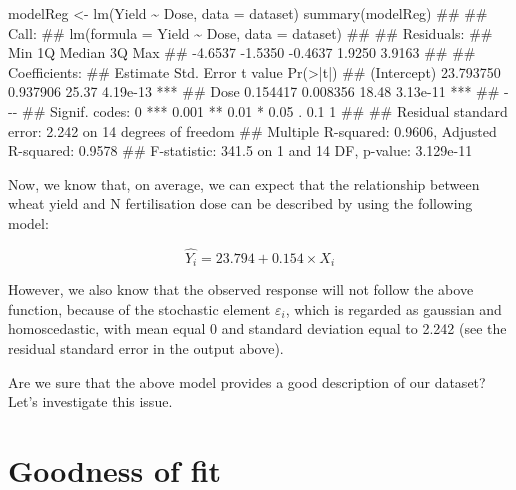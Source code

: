 \documentclass[a4paper,12pt,oneside]{book}
\newenvironment{Shaded}{\begin{snugshade}}{\end{snugshade}}
\newcommand{\SpecialCharTok}[1]{#1}
\newcommand{\DocumentationTok}[1]{#1}
\newcommand{\OtherTok}[1]{#1}
\newcommand{\FunctionTok}[1]{#1}
\newcommand{\AttributeTok}[1]{#1}
\newcommand{\NormalTok}[1]{#1}
\begin{document}
\begin{Shaded}
\begin{Highlighting}[]
\NormalTok{modelReg }\OtherTok{\textless{}{-}} \FunctionTok{lm}\NormalTok{(Yield }\SpecialCharTok{\textasciitilde{}}\NormalTok{ Dose, }\AttributeTok{data =}\NormalTok{ dataset)}
\FunctionTok{summary}\NormalTok{(modelReg)}
\DocumentationTok{\#\# }
\DocumentationTok{\#\# Call:}
\DocumentationTok{\#\# lm(formula = Yield \textasciitilde{} Dose, data = dataset)}
\DocumentationTok{\#\# }
\DocumentationTok{\#\# Residuals:}
\DocumentationTok{\#\#     Min      1Q  Median      3Q     Max }
\DocumentationTok{\#\# {-}4.6537 {-}1.5350 {-}0.4637  1.9250  3.9163 }
\DocumentationTok{\#\# }
\DocumentationTok{\#\# Coefficients:}
\DocumentationTok{\#\#              Estimate Std. Error t value Pr(\textgreater{}|t|)    }
\DocumentationTok{\#\# (Intercept) 23.793750   0.937906   25.37 4.19e{-}13 ***}
\DocumentationTok{\#\# Dose         0.154417   0.008356   18.48 3.13e{-}11 ***}
\DocumentationTok{\#\# {-}{-}{-}}
\DocumentationTok{\#\# Signif. codes:  0 \textquotesingle{}***\textquotesingle{} 0.001 \textquotesingle{}**\textquotesingle{} 0.01 \textquotesingle{}*\textquotesingle{} 0.05 \textquotesingle{}.\textquotesingle{} 0.1 \textquotesingle{} \textquotesingle{} 1}
\DocumentationTok{\#\# }
\DocumentationTok{\#\# Residual standard error: 2.242 on 14 degrees of freedom}
\DocumentationTok{\#\# Multiple R{-}squared:  0.9606, Adjusted R{-}squared:  0.9578 }
\DocumentationTok{\#\# F{-}statistic: 341.5 on 1 and 14 DF,  p{-}value: 3.129e{-}11}
\end{Highlighting}
\end{Shaded}

Now, we know that, on average, we can expect that the relationship between wheat yield and N fertilisation dose can be described by using the following model:

\[\hat{Y_i} = 23.794 + 0.154 \times X_i\]

However, we also know that the observed response will not follow the above function, because of the stochastic element \(\varepsilon_i\), which is regarded as gaussian and homoscedastic, with mean equal 0 and standard deviation equal to 2.242 (see the residual standard error in the output above).

Are we sure that the above model provides a good description of our dataset? Let's investigate this issue.

\hypertarget{goodness-of-fit}{%
\section{Goodness of fit}\label{goodness-of-fit}}
\end{document}
